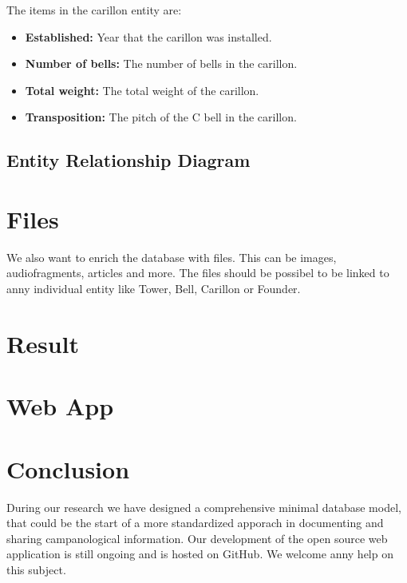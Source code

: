 \documentclass[11pt, a4paper]{article}
\begin{document}
The items in the carillon entity are:

\begin{itemize}
    \item \textbf{Established:} Year that the carillon was installed.
    \item \textbf{Number of bells:} The number of bells in the carillon.
    \item \textbf{Total weight:} The total weight of the carillon.
    \item \textbf{Transposition:} The pitch of the C bell in the carillon.
\end{itemize}

\subsection{Entity Relationship Diagram}

\section{Files}

We also want to enrich the database with files. This can be images, audiofragments, articles and more. 
The files should be possibel to be linked to anny individual entity like Tower, Bell, Carillon or Founder.

\section{Result}

\section{Web App}

\section{Conclusion}

During our research we have designed a comprehensive minimal database model, that could be 
the start of a more standardized apporach in documenting and sharing campanological information.
Our development of the open source web application is still ongoing and is hosted 
on GitHub. We welcome anny help on this subject. 
\end{document}
